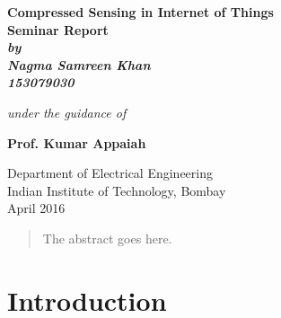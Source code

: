 \documentclass[12pt]{article}
\theoremstyle{definition}
\begin{document}
\begin{titlepage}
\thispagestyle{empty}
\vspace*{0.7cm}
{\centering     
\large
{\Large\bf Compressed Sensing in Internet of Things}\\
\vspace{3cm}
\bf{Seminar Report}\\
\vspace{0.25cm}
\vspace{0.1cm}
\it
by \\
\vspace{.5cm}
\rm
{\large \bf {Nagma Samreen Khan}}\\
{\large \bf {153079030}}

\vspace{1cm}

{\it{under the guidance of}} \\
\vspace{.5cm}

\hspace{.05cm} {\large \bf {Prof. Kumar Appaiah}}\\
\vspace {0.5cm}

\begin{figure}[h] 
{\par}
\end{figure} 

Department of Electrical Engineering \\ 
Indian Institute of Technology, Bombay\\ 
{\centering
\hspace{6.5cm}April 2016} 
}
\pagebreak 
\end{titlepage}

\begin{abstract}
The abstract goes here.
\end{abstract}
\section{Introduction}
\end{document}
